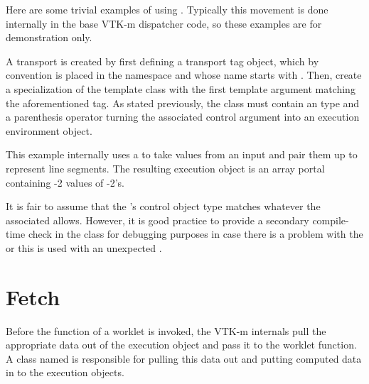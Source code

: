 Here are some trivial examples of using
. Typically this movement is done internally in
the base VTK-m dispatcher code, so these examples are for demonstration
only.


A transport is created by first defining a transport tag object, which by convention is placed in the \vtkmcontarg{} namespace and whose name starts with .
Then, create a specialization of the  template class with the first template argument matching the aforementioned tag.
As stated previously, the  class must contain an  type and a parenthesis operator turning the associated control argument into an execution environment object.

This example internally uses a  to take values from an input  and pair them up to represent line segments.
The resulting execution object is an array portal containing -2 values of -2's.


\begin{commonerrors}
  It is fair to assume that the 's control object type matches whatever the associated  allows.
  However, it is good practice to provide a secondary compile-time check in the  class for debugging purposes in case there is a problem with the  or this  is used with an unexpected .
\end{commonerrors}



\section{Fetch}
\label{sec:Fetch}


Before the function of a worklet is invoked, the VTK-m internals pull the
appropriate data out of the execution object and pass it to the worklet
function. A class named  is responsible for pulling this
data out and putting computed data in to the execution objects.

